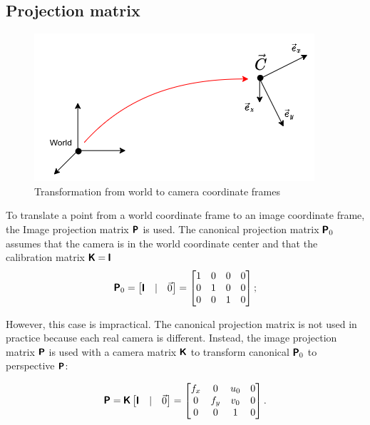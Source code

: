 \subsection{Projection matrix}

\begin{figure}[h]
    \centering
    \includegraphics[width=.5\textwidth]{graphics/frames.png}
    \caption{Transformation from world to camera coordinate frames}
    \label{fig:frames}
\end{figure}

To translate a point from a world coordinate frame to an image coordinate frame, the Image projection matrix $\pmb{\mathsf{P}}$ is used. 
The canonical projection matrix $\pmb{\mathsf{P}}_0$ assumes that the camera is in the world coordinate center and that the calibration matrix $\pmb{\mathsf{K}} = \pmb{\mathsf{I}}$
\begin{equation}
\pmb{\mathsf{P}}_0 = \begin{bmatrix} \pmb{\mathsf{I}} & | & \vec{0} \end{bmatrix} = 
    \begin{bmatrix}
    1 & 0 & 0 & 0 \\
    0 & 1 & 0 & 0 \\
    0 & 0 & 1 & 0 \\
    \end{bmatrix};
\end{equation}

However, this case is impractical. 
The canonical projection matrix is not used in practice because each real camera is different. 
Instead, the image projection matrix $\pmb{\mathsf{P}}$ is used with a camera matrix $\pmb{\mathsf{K}}$ to transform canonical $\pmb{\mathsf{P}}_0$ to perspective $\pmb{\mathsf{P}}$:

\begin{equation}
\pmb{\mathsf{P}} = \pmb{\mathsf{K}} \begin{bmatrix} \pmb{\mathsf{I}} & | & \vec{0} \end{bmatrix} = 
    \begin{bmatrix} 
    f_x & 0 & u_0 & 0 \\
    0 & f_y & v_0 & 0 \\ 
    0 & 0 & 1 & 0 \\
    \end{bmatrix}.
\end{equation}

